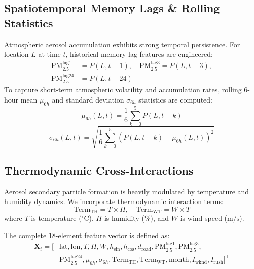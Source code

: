 \documentclass[journal]{IEEEtran}
\begin{document}
\subsection{Spatiotemporal Memory Lags \& Rolling Statistics}
Atmospheric aerosol accumulation exhibits strong temporal persistence. For location $L$ at time $t$, historical memory lag features are engineered:
\begin{align}
\text{PM}_{2.5}^{\text{lag}1} &= P(L, t-1), \quad \text{PM}_{2.5}^{\text{lag}3} = P(L, t-3), \nonumber \\
\text{PM}_{2.5}^{\text{lag}24} &= P(L, t-24)
\end{align}
To capture short-term atmospheric volatility and accumulation rates, rolling 6-hour mean $\mu_{6h}$ and standard deviation $\sigma_{6h}$ statistics are computed:
\begin{equation}
\mu_{6h}(L,t) = \frac{1}{6} \sum_{k=0}^5 P(L, t-k)
\end{equation}
\begin{equation}
\sigma_{6h}(L,t) = \sqrt{\frac{1}{6} \sum_{k=0}^5 \left(P(L, t-k) - \mu_{6h}(L,t)\right)^2}
\end{equation}

\subsection{Thermodynamic Cross-Interactions}
Aerosol secondary particle formation is heavily modulated by temperature and humidity dynamics. We incorporate thermodynamic interaction terms:
\begin{equation}
\text{Term}_{\text{TH}} = T \times H, \quad \text{Term}_{\text{WT}} = W \times T
\end{equation}
where $T$ is temperature ($^\circ\text{C}$), $H$ is humidity (\%), and $W$ is wind speed ($\text{m/s}$).

The complete 18-element feature vector is defined as:
\begin{align}
\mathbf{X}_i = \big[ & \text{lat}, \text{lon}, T, H, W, h_{\text{sin}}, h_{\text{cos}}, d_{\text{road}}, \text{PM}_{2.5}^{\text{lag}1}, \text{PM}_{2.5}^{\text{lag}3}, \nonumber \\
& \text{PM}_{2.5}^{\text{lag}24}, \mu_{6h}, \sigma_{6h}, \text{Term}_{\text{TH}}, \text{Term}_{\text{WT}}, \text{month}, I_{\text{wknd}}, I_{\text{rush}} \big]^\top
\end{align}
\end{document}
